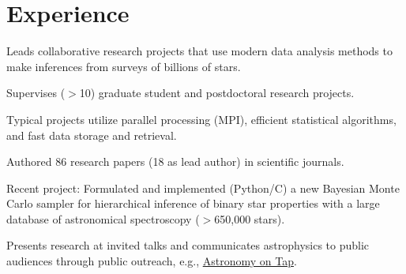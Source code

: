 \documentclass[letterpaper,12pt]{deedy-resume}
\begin{document}
\begin{minipage}[t]{0.64\textwidth} %


\section{Experience}


\vspace{1.5\topsep} %
\begin{tightitemize}
    \item Leads collaborative research projects that use modern data analysis methods to make inferences from surveys of billions of stars.
    \item Supervises ($>$10) graduate student and postdoctoral research projects.
    \item Typical projects utilize parallel processing (MPI), efficient statistical algorithms, and fast data storage and retrieval.
    \item Authored 86 research papers (18 as lead author) in scientific journals.
    \item Recent project: Formulated and implemented (Python/C) a new Bayesian Monte Carlo sampler for hierarchical inference of binary star properties with a large database of astronomical spectroscopy ($>$650,000 stars).
    \item Presents research at invited talks and communicates astrophysics to public audiences through public outreach, e.g., \href{https://astronomyontap.org/}{Astronomy on Tap}.
\end{tightitemize}

\sectionspace %



\end{minipage}
\end{document}
